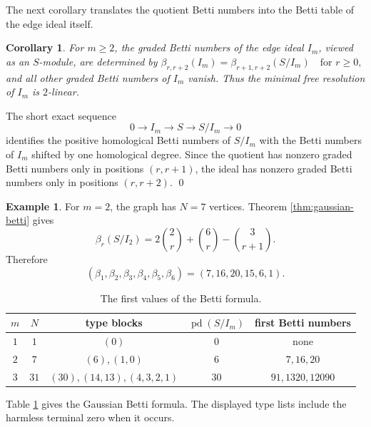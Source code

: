\documentclass[12pt]{article}
\newtheorem{corollary}[theorem]{Corollary}
\theoremstyle{definition}
\newtheorem{example}[theorem]{Example}
\renewenvironment{proof}{{\bf \noindent Proof.}}{\qed}
\begin{document}
\medskip

The next corollary translates the quotient Betti numbers into the Betti table of the edge ideal itself.

\medskip

\begin{corollary}\label{cor:gaussian-graded-betti-ideal}
	For $m\geq 2$, the graded Betti numbers of the edge ideal $I_m$, viewed as an $S$-module, are determined by
	$ \beta_{r,r+2}(I_m)=\beta_{r+1,r+2}(S/I_m)\quad\text{for }r\geq 0, $
	and all other graded Betti numbers of $I_m$ vanish.  Thus the minimal free resolution of $I_m$ is $2$-linear.
\end{corollary}

\begin{proof}
	The short exact sequence
	$$
	0\longrightarrow I_m\longrightarrow S\longrightarrow S/I_m\longrightarrow 0
	$$
	identifies the positive homological Betti numbers of $S/I_m$ with the Betti numbers of $I_m$ shifted by one homological degree.  Since the quotient has nonzero graded Betti numbers only in positions $(r,r+1)$, the ideal has nonzero graded Betti numbers only in positions $(r,r+2)$.
\end{proof}

\medskip

\begin{example}\label{ex:m2-betti}
	For $m=2$, the graph has $N=7$ vertices.  Theorem \ref{thm:gaussian-betti} gives
	$$
	\beta_r(S/I_2)=2\binom{2}{r}+\binom{6}{r}-\binom{3}{r+1}.
	$$
	Therefore
	$$
	(\beta_1,\beta_2,\beta_3,\beta_4,\beta_5,\beta_6)=(7,16,20,15,6,1).
	$$
\end{example}

\medskip

\begin{table}[H]
	\centering
	\begin{tabular}{c c c c c}
		\toprule
		$m$ & $N$ & type blocks & $\operatorname{pd}(S/I_m)$ & first Betti numbers \\
		\midrule
		$1$ & $1$ & $(0)$ & $0$ & none \\
		$2$ & $7$ & $(6),(1,0)$ & $6$ & $7,16,20$ \\
		$3$ & $31$ & $(30),(14,13),(4,3,2,1)$ & $30$ & $91,1320,12090$ \\
		\bottomrule
	\end{tabular}
	\caption{The first values of the Betti formula.}
	\label{tab:gaussian-betti-values}
\end{table}
Table \ref{tab:gaussian-betti-values} gives the Gaussian Betti formula.  The displayed type lists include the harmless terminal zero when it occurs.
\medskip
\end{document}
